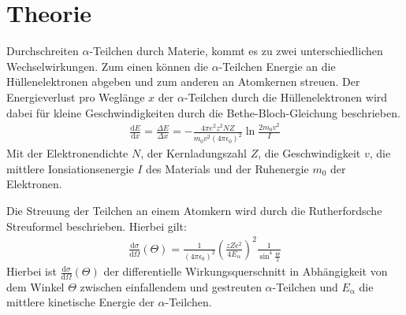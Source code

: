 \section{Theorie}
\label{sec:Theorie}
Durchschreiten $\alpha$-Teilchen durch Materie, kommt es zu zwei unterschiedlichen Wechselwirkungen.
Zum einen können die $\alpha$-Teilchen Energie an die Hüllenelektronen abgeben und zum anderen
an Atomkernen streuen. Der Energieverlust pro Weglänge $x$ der $\alpha$-Teilchen durch die Hüllenelektronen wird dabei für
kleine Geschwindigkeiten durch die
Bethe-Bloch-Gleichung beschrieben.
\begin{align}
  \frac{\mathrm{d}E}{\mathrm{d}x} =\frac{\Delta E}{\Delta x}= - \frac{4\pi e^2 z^2 N Z}{m_{\mathrm{0}}v^2(4 \pi \epsilon_{\mathrm{0}})^2} \ln{\frac{2 m_{\mathrm{0}} v^2}{I}}
\end{align}
Mit der Elektronendichte $N$, der Kernladungszahl $Z$, die Geschwindigkeit $v$, die mittlere Ionsiationsenergie $I$ des Materials
und der Ruhenergie $m_{\mathrm{0}}$ der Elektronen.

Die Streuung der Teilchen an einem Atomkern wird durch die Rutherfordsche Streuformel beschrieben. Hierbei gilt:
\begin{align}
  \frac{\mathrm{d}\sigma}{\mathrm{d}\Omega}(\Theta) = \frac{1}{(4 \pi \epsilon_{\mathrm{0}})^2} \left(\frac{z Z e^2}{4 E_{\mathrm{\alpha}}}\right)^2 \frac{1}{\sin^4{\frac{\Theta}{2}}}
  \label{eqn:rutherford}
\end{align}
Hierbei ist $\frac{\mathrm{d}\sigma}{\mathrm{d}\Omega}(\Theta)$ der differentielle Wirkungsquerschnitt in Abhängigkeit von dem Winkel $\Theta$
zwischen einfallendem und gestreuten $\alpha$-Teilchen und
$E_{\mathrm{\alpha}}$ die mittlere kinetische Energie der $\alpha$-Teilchen.
